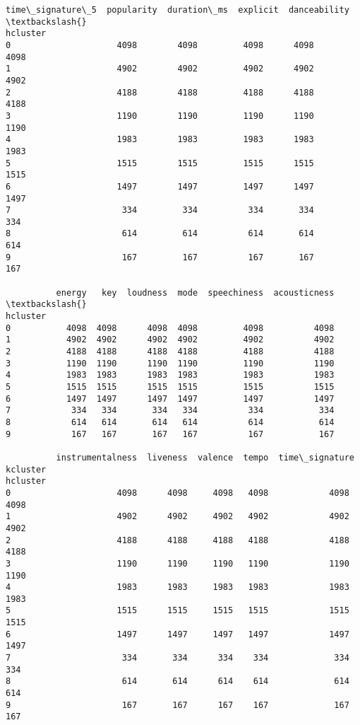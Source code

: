 \documentclass[11pt]{article}
\begin{document}
\begin{tcolorbox}[breakable, size=fbox, boxrule=.5pt, pad at break*=1mm, opacityfill=0]
\begin{Verbatim}[commandchars=\\\{\}]
          time\_signature\_5  popularity  duration\_ms  explicit  danceability  \textbackslash{}
hcluster
0                     4098        4098         4098      4098          4098
1                     4902        4902         4902      4902          4902
2                     4188        4188         4188      4188          4188
3                     1190        1190         1190      1190          1190
4                     1983        1983         1983      1983          1983
5                     1515        1515         1515      1515          1515
6                     1497        1497         1497      1497          1497
7                      334         334          334       334           334
8                      614         614          614       614           614
9                      167         167          167       167           167

          energy   key  loudness  mode  speechiness  acousticness  \textbackslash{}
hcluster
0           4098  4098      4098  4098         4098          4098
1           4902  4902      4902  4902         4902          4902
2           4188  4188      4188  4188         4188          4188
3           1190  1190      1190  1190         1190          1190
4           1983  1983      1983  1983         1983          1983
5           1515  1515      1515  1515         1515          1515
6           1497  1497      1497  1497         1497          1497
7            334   334       334   334          334           334
8            614   614       614   614          614           614
9            167   167       167   167          167           167

          instrumentalness  liveness  valence  tempo  time\_signature  kcluster
hcluster
0                     4098      4098     4098   4098            4098      4098
1                     4902      4902     4902   4902            4902      4902
2                     4188      4188     4188   4188            4188      4188
3                     1190      1190     1190   1190            1190      1190
4                     1983      1983     1983   1983            1983      1983
5                     1515      1515     1515   1515            1515      1515
6                     1497      1497     1497   1497            1497      1497
7                      334       334      334    334             334       334
8                      614       614      614    614             614       614
9                      167       167      167    167             167       167
\end{Verbatim}
\end{tcolorbox}
        
\end{document}
